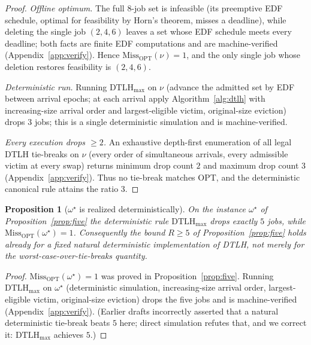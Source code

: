 \documentclass{amsart}
\newtheorem{proposition}[theorem]{Proposition}
\theoremstyle{definition}
\begin{document}
\begin{proof}
\emph{Offline optimum.} The full $8$-job set is infeasible (its preemptive EDF
schedule, optimal for feasibility by Horn's theorem, misses a deadline), while
deleting the single job $(2,4,6)$ leaves a set whose EDF schedule meets every
deadline; both facts are finite EDF computations and are machine-verified
(Appendix~\ref{app:verify}). Hence $\mathrm{Miss}_{\mathrm{OPT}}(\nu)=1$, and the
only single job whose deletion restores feasibility is $(2,4,6)$.

\emph{Deterministic run.} Running $\mathrm{DTLH}_{\max}$ on $\nu$ (advance the
admitted set by EDF between arrival epochs; at each arrival apply
Algorithm~\ref{alg:dtlh} with increasing-size arrival order and largest-eligible
victim, original-size eviction) drops $3$ jobs; this is a single deterministic
simulation and is machine-verified.

\emph{Every execution drops $\ge 2$.} An exhaustive depth-first enumeration of
all legal DTLH tie-breaks on $\nu$ (every order of simultaneous arrivals, every
admissible victim at every swap) returns minimum drop count $2$ and maximum drop
count $3$ (Appendix~\ref{app:verify}). Thus no tie-break matches OPT, and the
deterministic canonical rule attains the ratio $3$.
\end{proof}

\begin{proposition}[$\omega^\star$ is realized deterministically]\label{prop:det5}
On the instance $\omega^\star$ of Proposition~\ref{prop:five} the deterministic
rule $\mathrm{DTLH}_{\max}$ drops exactly $5$ jobs, while
$\mathrm{Miss}_{\mathrm{OPT}}(\omega^\star)=1$. Consequently the bound $R\ge5$ of
Proposition~\ref{prop:five} holds already for a fixed natural deterministic
implementation of DTLH, not merely for the worst-case-over-tie-breaks quantity.
\end{proposition}

\begin{proof}
$\mathrm{Miss}_{\mathrm{OPT}}(\omega^\star)=1$ was proved in
Proposition~\ref{prop:five}. Running $\mathrm{DTLH}_{\max}$ on $\omega^\star$
(deterministic simulation, increasing-size arrival order, largest-eligible
victim, original-size eviction) drops the five jobs and is machine-verified
(Appendix~\ref{app:verify}). (Earlier drafts incorrectly asserted that a natural
deterministic tie-break beats $5$ here; direct simulation refutes that, and we
correct it: $\mathrm{DTLH}_{\max}$ achieves $5$.)
\end{proof}
\end{document}
